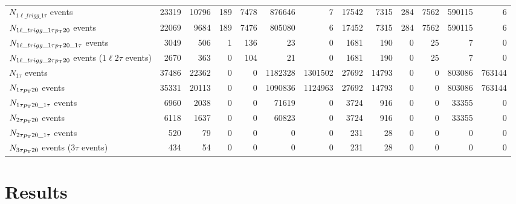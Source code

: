 \documentclass[letterpaper,12pt]{article}
\begin{document}
\begin{table}[h]
{\begin{tabular}{l|rr|rrrr|rr|rrrr}
      $N_{1\ell\_trigg\_1\tau}$ events & 23319 & 10796 & 189 & 7478 & 876646 & 7 & 17542 & 7315 & 284 & 7562 & 590115 & 6\\
      $N_{1\ell\_trigg\_1\tau p_{\mathrm{T}}20}$ events & 22069 & 9684 & 189 & 7476 & 805080 & 6 & 17452 & 7315 & 284 & 7562 & 590115 & 6\\
      $N_{1\ell\_trigg\_1\tau p_{\mathrm{T}}20\_1\tau}$ events & 3049 & 506 & 1 & 136 & 23 & 0 & 1681 & 190 & 0 & 25 & 7 & 0\\
      $N_{1\ell\_trigg\_2\tau p_{\mathrm{T}}20}$ events ($1\ell2\tau$ events) & 2670 & 363 & 0 & 104 & 21 & 0 & 1681 & 190 & 0 & 25 & 7 & 0\\
      $N_{1\tau}$ events & 37486 & 22362 & 0 & 0 & 1182328 & 1301502 & 27692 & 14793 & 0 & 0 & 803086 & 763144\\
      $N_{1\tau p_{\mathrm{T}}20}$ events & 35331 & 20113 & 0 & 0 & 1090836 & 1124963 & 27692 & 14793 & 0 & 0 & 803086 & 763144\\
      $N_{1\tau p_{\mathrm{T}}20\_1\tau}$ events & 6960 & 2038 & 0 & 0 & 71619 & 0 & 3724 & 916 & 0 & 0 & 33355 & 0\\
      $N_{2\tau p_{\mathrm{T}}20}$ events & 6118 & 1637 & 0 & 0 & 60823 & 0 & 3724 & 916 & 0 & 0 & 33355 & 0\\
      $N_{2\tau p_{\mathrm{T}}20\_1\tau}$ events & 520 & 79 & 0 & 0 & 0 & 0 & 231 & 28 & 0 & 0 & 0 & 0\\
      $N_{3\tau p_{\mathrm{T}}20}$ events ($3\tau$ events) & 434 & 54 & 0 & 0 & 0 & 0 & 231 & 28 & 0 & 0 & 0 & 0\\
      \hline
      \hline	
    \end{tabular}%
  }
  \caption{}
  \label{tab:cutflow}
\end{table}

\section{Results}
\label{sec:results}
\end{document}
